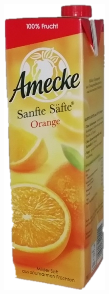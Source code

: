 \documentclass[a4paper,12pt,oneside]{article}
\begin{document}
\begin{figure}[htb]
\begin{minipage}[c]{0.08\textwidth}
\includegraphics[width=\textwidth]{Sources/image105_segmentiert.png}

\end{minipage}
\end{figure}
\end{document}
